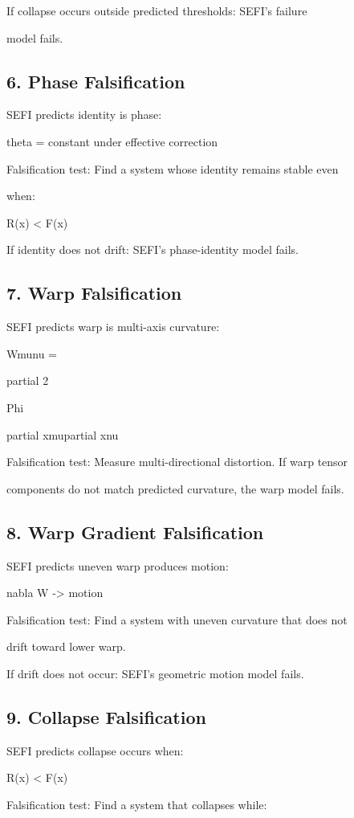 \documentclass[10pt]{article}
\begin{document}
If collapse occurs outside predicted thresholds: SEFI's failure

model fails.

\subsection*{6. Phase Falsification}
SEFI predicts identity is phase:

theta = constant under effective correction

Falsification test: Find a system whose identity remains stable even

when:

R(x) < F(x)

If identity does not drift: SEFI's phase-identity model fails.

\subsection*{7. Warp Falsification}
SEFI predicts warp is multi-axis curvature:

Wmunu =

partial 2

Phi

partial xmupartial xnu

Falsification test: Measure multi-directional distortion. If warp tensor

components do not match predicted curvature, the warp model fails.

\subsection*{8. Warp Gradient Falsification}
SEFI predicts uneven warp produces motion:

nabla W -> motion


Falsification test: Find a system with uneven curvature that does not

drift toward lower warp.

If drift does not occur: SEFI's geometric motion model fails.

\subsection*{9. Collapse Falsification}
SEFI predicts collapse occurs when:

R(x) < F(x)

Falsification test: Find a system that collapses while:
\end{document}
